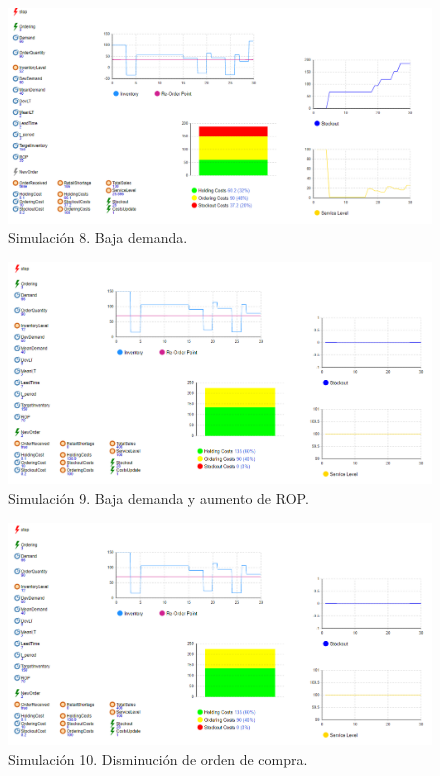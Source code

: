 \begin{figure}[H]
    \includegraphics[width=\linewidth]{images/img8invent}
    \caption{Simulación 8. Baja demanda.}
\end{figure}

\begin{figure}[H]
    \includegraphics[width=\linewidth]{images/img9invent}
    \caption{Simulación 9. Baja demanda y aumento de ROP.}
\end{figure}

\begin{figure}[H]
    \includegraphics[width=\linewidth]{images/img9invent}
    \caption{Simulación 10. Disminución de orden de compra.}
\end{figure}

